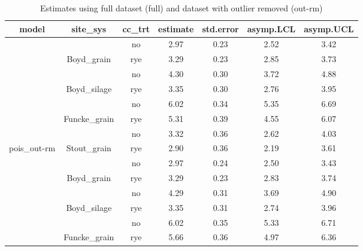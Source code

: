 \documentclass[]{article}
\begin{document}
\begin{table}[H]

\caption{\label{tab:unnamed-chunk-6}Estimates using full dataset (full) and dataset with outlier removed (out-rm)}
\centering
\begin{tabular}[t]{ccccccc}
\toprule
model & site\_sys & cc\_trt & estimate & std.error & asymp.LCL & asymp.UCL\\
\midrule
\rowcolor{gray!6}   &  & no & 2.97 & 0.23 & 2.52 & 3.42\\

 & \multirow{-2}{*}{\centering\arraybackslash Boyd\_grain} & rye & 3.29 & 0.23 & 2.85 & 3.73\\

\rowcolor{gray!6}   &  & no & 4.30 & 0.30 & 3.72 & 4.88\\

 & \multirow{-2}{*}{\centering\arraybackslash Boyd\_silage} & rye & 3.35 & 0.30 & 2.76 & 3.95\\

\rowcolor{gray!6}   &  & no & 6.02 & 0.34 & 5.35 & 6.69\\

 & \multirow{-2}{*}{\centering\arraybackslash Funcke\_grain} & rye & 5.31 & 0.39 & 4.55 & 6.07\\

\rowcolor{gray!6}   &  & no & 3.32 & 0.36 & 2.62 & 4.03\\

\multirow{-8}{*}{\centering\arraybackslash pois\_out-rm} & \multirow{-2}{*}{\centering\arraybackslash Stout\_grain} & rye & 2.90 & 0.36 & 2.19 & 3.61\\
\cmidrule{1-7}
\rowcolor{gray!6}   &  & no & 2.97 & 0.24 & 2.50 & 3.43\\

 & \multirow{-2}{*}{\centering\arraybackslash Boyd\_grain} & rye & 3.29 & 0.23 & 2.83 & 3.74\\

\rowcolor{gray!6}   &  & no & 4.29 & 0.31 & 3.69 & 4.90\\

 & \multirow{-2}{*}{\centering\arraybackslash Boyd\_silage} & rye & 3.35 & 0.31 & 2.74 & 3.96\\

\rowcolor{gray!6}   &  & no & 6.02 & 0.35 & 5.33 & 6.71\\

 & \multirow{-2}{*}{\centering\arraybackslash Funcke\_grain} & rye & 5.66 & 0.36 & 4.97 & 6.36\\


\end{tabular}
\end{table}
\end{document}
